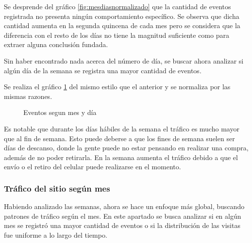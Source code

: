 \documentclass[a4paper]{article}
\begin{document}
Se desprende del gráfico \ref{fig:mesdiasnormalizado} que la cantidad de eventos registrada no presenta ningún comportamiento específico. Se observa que dicha cantidad aumenta en la segunda quincena de cada mes pero se considera que la diferencia con el resto de los días no tiene la magnitud suficiente como para extraer alguna conclusión fundada. 

Sin haber encontrado nada acerca del número de día, se buscar ahora analizar si algún día de la semana se registra una mayor cantidad de eventos. 

Se realiza el gráfico \ref{fig:messemanasnormalizado} del mismo estilo que el anterior y se normaliza por las mismas razones.

\begin{figure}[h!]
	\caption{Eventos segun mes y día}
	\label{fig:messemanasnormalizado}
\end{figure}

Es notable que durante los días hábiles de la semana el tráfico es mucho mayor que al fin de semana. Esto puede deberse a que los fines de semana suelen ser días de descanso, donde la gente puede no estar pensando en realizar una compra, además de no poder retirarla. En la semana aumenta el tráfico debido a que el envío o el retiro del celular puede realizarse en el momento.

\subsubsection{Tráfico del sitio según mes}

Habiendo analizado las semanas, ahora se hace un enfoque más global, buscando patrones de tráfico según el mes. En este apartado se busca analizar si en algún mes se registró una mayor cantidad de eventos o si la distribución de las visitas fue uniforme a lo largo del tiempo.
\end{document}
